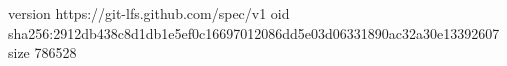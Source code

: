 version https://git-lfs.github.com/spec/v1
oid sha256:2912db438c8d1db1e5ef0c16697012086dd5e03d06331890ac32a30e13392607
size 786528
